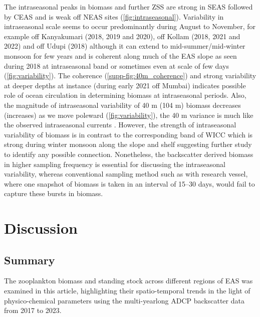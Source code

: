 \documentclass{article}
\begin{document}
	The intraseasonal peaks in biomass and further ZSS are strong in SEAS followed by CEAS and is weak off NEAS sites (\cref{fig:intraseasonal}). Variability in intraseasonal scale seems to occur predominantly during August to November, for example off Kanyakumari (2018, 2019 and 2020), off Kollam (2018, 2021 and 2022) and off Udupi (2018) although it can extend to mid-summer/mid-winter monsoon for few years and is coherent along much of the EAS slope as seen during 2018 at intraseasonal band or sometimes even at scale of few days (\cref{fig:variability}). The coherence (\cref{supp-fig:40m_coherence}) and strong variability at deeper depths at instance (during early 2021 off Mumbai) indicates possible role of ocean circulation in determining biomass at intraseasonal periods. Also, the magnitude of intraseasonal variability of 40 m (104 m) biomass decreases (increases) as we move poleward (\cref{fig:variability}), the 40 m variance is much like the observed intraseasonal currents \citep{amol2014observed, chaudhuri2020observed,chaudhuri2021observed}. However, the strength of intraseasonal variability of biomass is in contrast to the corresponding band of WICC which is strong during winter monsoon along the slope \citep{amol2014observed, chaudhuri2020observed} and shelf \citep{chaudhuri2021observed} suggesting further study to identify any possible connection. Nonetheless, the backscatter derived biomass in higher sampling frequency is essential for discussing the intraseasonal variability, whereas conventional sampling method such as with research vessel, where one snapshot of biomass is taken in an interval of 15--30 days, would fail to capture these bursts in biomass.
	   

	\section{Discussion}
	
	\subsection{Summary}
	The zooplankton biomass and standing stock across different regions of EAS was examined in this article, highlighting their spatio-temporal trends in the light of physico-chemical parameters using the multi-yearlong ADCP backscatter data from 2017 to 2023. 
	
\end{document}
